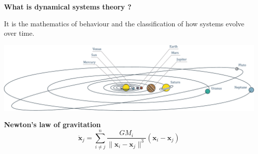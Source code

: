 \documentclass[usenames,dvipsnames,svgnames,10pt,aspectratio=169]{beamer}
\begin{document}
\begin{frame}[t, c]{}{}
  \begin{block}{\centering \textbf{What is dynamical systems theory ?}}

    \bigskip

    \centering
    It is the mathematics of behaviour and the classification of how systems evolve over time.
  \end{block}
\end{frame}

\begin{frame}[t, c]{}{}
  \begin{minipage}{.58\textwidth}
    \centering
    \includegraphics[width=\textwidth]{solar_system}
  \end{minipage}%
  \hfill
  \begin{minipage}{.38\textwidth}
    \centering
    \textbf{Newton's law of gravitation}
    \[
    \ddot{\bm{x}}_j = \sum_{i \neq j}^n \dfrac{G M_i}{\| \bm{x}_i - \bm{x}_j \|^3} \left( \bm{x}_i - \bm{x}_j \right)
    \]
  \end{minipage}

  \vspace{-1cm}
\end{frame}
\end{document}
